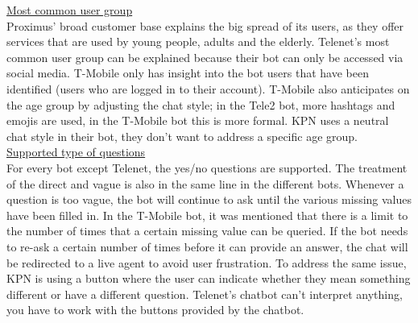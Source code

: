 \break
\ul{Most common user group}\\
Proximus' broad customer base explains the big spread of its users, as they offer services that are used by young people, adults and the elderly. Telenet's most common user group can be explained because their bot can only be accessed via social media. T-Mobile only has insight into the bot users that have been identified (users who are logged in to their account). T-Mobile also anticipates on the age group by adjusting the chat style; in the Tele2 bot, more hashtags and emojis are used, in the T-Mobile bot this is more formal. KPN uses a neutral chat style in their bot, they don't want to address a specific age group.\\
\break
\ul{Supported type of questions}\\
For every bot except Telenet, the yes/no questions are supported. The treatment of the direct and vague is also in the same line in the different bots. Whenever a question is too vague, the bot will continue to ask until the various missing values have been filled in. In the T-Mobile bot, it was mentioned that there is a limit to the number of times that a certain missing value can be queried. If the bot needs to re-ask a certain number of times before it can provide an answer, the chat will be redirected to a live agent to avoid user frustration. To address the same issue, KPN is using a button where the user can indicate whether they mean something different or have a different question. Telenet's chatbot can't interpret anything, you have to work with the buttons provided by the chatbot.\\
